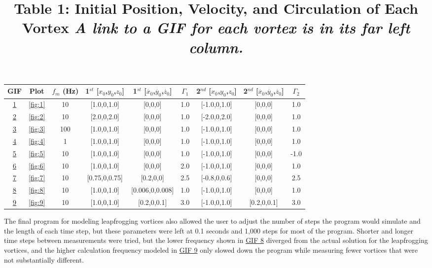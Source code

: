 \documentclass{article}
\begin{document}
\begin{table}
	\centering
	\title{Table 1: Initial Position, Velocity, and Circulation of Each Vortex \newline}
	\title{\emph{A link to a GIF for each vortex is in its far left column.}}
	\begin{tabular}{ | c | c | c | c | c | c | c | c | c |}
		\hline
		GIF & Plot & $f_m$ (Hz) & 1$^{st}$ [$x_0$,$y_0$,$z_0$] & 1$^{st}$ [$\dot{x_0}$,$\dot{y_0}$,$\dot{z_0}$] & $\Gamma_1$ & 2$^{nd}$ [$x_0$,$y_0$,$z_0$] & 2$^{nd}$ [$\dot{x_0}$,$\dot{y_0}$,$\dot{z_0}$] & $\Gamma_2$ \\ \hline
		\href{https://imgur.com/U4cND6X}{1} & \ref{fig:1} & 10 & [1.0,0,1.0] & [0,0,0] & 1.0 & [-1.0,0,1.0] & [0,0,0] & 1.0 \\ \hline
		\href{https://imgur.com/lviamWB}{2} & \ref{fig:2} & 10 & [2.0,0,2.0] & [0,0,0] & 1.0 & [-2.0,0,2.0] & [0,0,0] & 1.0 \\ \hline
		\href{https://imgur.com/6jT1mT0}{3} & \ref{fig:3} & 100 & [1.0,0,1.0] & [0,0,0] & 1.0 & [-1.0,0,1.0] & [0,0,0] & 1.0 \\ \hline
		\href{https://imgur.com/PtazOFB}{4} & \ref{fig:4} & 1 & [1.0,0,1.0] & [0,0,0] & 1.0 & [-1.0,0,1.0] & [0,0,0] & 1.0 \\ \hline	
		\href{https://imgur.com/wSpWEQV}{5} & \ref{fig:5} & 10 & [1.0,0,1.0] & [0,0,0] & 1.0 & [-1.0,0,1.0] & [0,0,0] & -1.0 \\ \hline
		\href{https://imgur.com/aZzMnJV}{6} & \ref{fig:6} & 10 & [1.0,0,1.0] & [0,0,0] & 2.0 & [-1.0,0,1.0] & [0,0,0] & 1.0 \\ \hline
		\href{https://imgur.com/nKVGuJ9}{7} & \ref{fig:7} & 10 & [0.75,0,0.75] & [0.2,0,0] & 2.5 & [-0.8,0,0.6] & [0,0,0] & 2.5 \\ \hline
		\href{https://imgur.com/UZyBsYO}{8} & \ref{fig:8} & 10 & [1.0,0,1.0] & [0.006,0,0.008] & 1.0 & [-1.0,0,1.0] & [0,0,0] & 1.0 \\ \hline
		\href{https://imgur.com/tctJPyS}{9} & \ref{fig:9} & 10 & [1.0,0,1.0] & [0.2,0,0.1] & 3.0 & [-1.0,0,1.0] & [0.2,0,0.1] & 3.0 \\ \hline
	\end{tabular}
\end{table}

The final program for modeling leapfrogging vortices also allowed the user to adjust the number of steps the program would simulate and the length of each time step, but these parameters were left at 0.1 seconds and 1,000 steps for most of the program. Shorter and longer time steps between measurements were tried, but the lower frequency shown in \href{https://imgur.com/PtazOFB}{GIF 8} diverged from the actual solution for the leapfrogging vortices, and the higher calculation frequency modeled in \href{https://imgur.com/6jT1mT0}{GIF 9} only slowed down the program while measuring fewer vortices that were not substantially different. \newline
\end{document}
